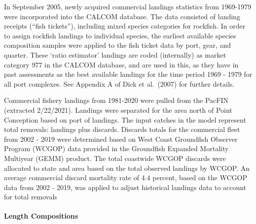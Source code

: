 \documentclass[11pt,
  english,
  a4paper,
]{article}
\begin{document}
In September 2005, newly acquired commercial landings statistics from 1969-1979 were incorporated into the CALCOM database. The data consisted of landing receipts (``fish tickets''), including mixed species categories for rockfish. In order to assign rockfish landings to individual species, the earliest available species composition samples were applied to the fish ticket data by port, gear, and quarter. These `ratio estimator' landings are coded (internally) as market category 977 in the CALCOM database, and are used in this, as they have in past assessments as the best available landings for the time period 1969 - 1979 for all port complexes. See Appendix A of Dick et al.~{(2007)\leavevmode\tagmcend\tagstructend} for further details.

\leavevmode\tagmcend\tagstructend\par


Commercial fishery landings from 1981-2020 were pulled from the PacFIN (extracted 2/22/2021). Landings were separated for the area north of Point Conception based on port of landings. The input catches in the model represent total removals: landings plus discards. Discards totals for the commercial fleet from 2002 - 2019 were determined based on West Coast Groundfish Observer Program (WCGOP) data provided in the Groundfish Expanded Mortality Multiyear (GEMM) product. The total coastwide WCGOP discards were allocated to state and area based on the total observed landings by WCGOP. An average commercial discard mortality rate of 4.4 percent, based on the WCGOP data from 2002 - 2019, was applied to adjust historical landings data to account for total removals

\leavevmode\tagmcend\tagstructend\par


\hypertarget{length-compositions}{%
\paragraph{Length Compositions}\label{length-compositions}}

\leavevmode\tagmcend\tagstructend

\end{document}
